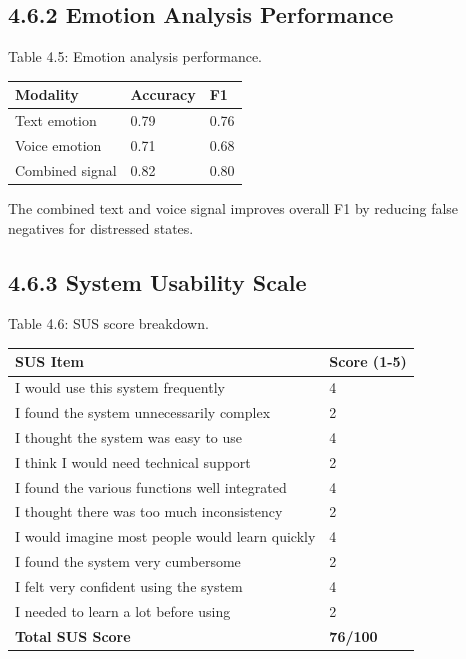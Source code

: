 \documentclass[
  letterpaper,
  12pt,
  a4paper,
  openany]{report}
\newcounter{none} %
\begin{document}
\subsection{4.6.2 Emotion Analysis
Performance}\label{emotion-analysis-performance}

Table 4.5: Emotion analysis performance.

{\def\LTcaptype{none} %
\begin{longtable}[]{@{}lll@{}}
\toprule\noalign{}
Modality & Accuracy & F1 \\
\midrule\noalign{}
\endhead
\bottomrule\noalign{}
\endlastfoot
Text emotion & 0.79 & 0.76 \\
Voice emotion & 0.71 & 0.68 \\
Combined signal & 0.82 & 0.80 \\
\end{longtable}
}

The combined text and voice signal improves overall F1 by reducing false
negatives for distressed states.

\subsection{4.6.3 System Usability Scale}\label{system-usability-scale}

Table 4.6: SUS score breakdown.

{\def\LTcaptype{none} %
\begin{longtable}[]{@{}ll@{}}
\toprule\noalign{}
SUS Item & Score (1-5) \\
\midrule\noalign{}
\endhead
\bottomrule\noalign{}
\endlastfoot
I would use this system frequently & 4 \\
I found the system unnecessarily complex & 2 \\
I thought the system was easy to use & 4 \\
I think I would need technical support & 2 \\
I found the various functions well integrated & 4 \\
I thought there was too much inconsistency & 2 \\
I would imagine most people would learn quickly & 4 \\
I found the system very cumbersome & 2 \\
I felt very confident using the system & 4 \\
I needed to learn a lot before using & 2 \\
\textbf{Total SUS Score} & \textbf{76/100} \\
\end{longtable}
}
\end{document}
